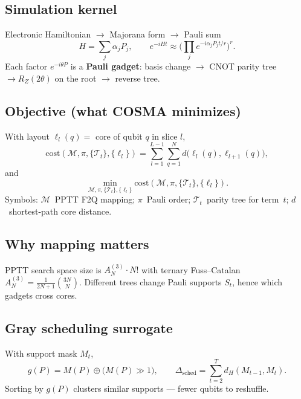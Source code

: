 \documentclass[11pt]{article}
\begin{document}
\subsection*{Simulation kernel}
Electronic Hamiltonian $\to$ Majorana form $\to$ Pauli sum
\begin{equation}
H=\sum_j \alpha_j P_j,\qquad
e^{-iHt}\approx\Bigg(\prod_j e^{-i\alpha_j P_j t/r}\Bigg)^r.
\end{equation}
Each factor $e^{-i\theta P}$ is a \textbf{Pauli gadget}: basis change $\to$ CNOT parity tree
$\to R_Z(2\theta)$ on the root $\to$ reverse tree.

\subsection*{Objective (what COSMA minimizes)}
With layout $\ell_l(q)=$ core of qubit $q$ in slice $l$,
\begin{equation}
\mathrm{cost}(\mathcal{M},\pi,\{\mathcal{T}_t\},\{\ell_l\})
=\sum_{l=1}^{L-1}\sum_{q=1}^{N} d\!\big(\ell_l(q),\ell_{l+1}(q)\big),
\label{eq:cost}
\end{equation}
and
\begin{equation}
\min_{\mathcal{M},\pi,\{\mathcal{T}_t\},\{\ell_l\}}
\mathrm{cost}(\mathcal{M},\pi,\{\mathcal{T}_t\},\{\ell_l\}).
\end{equation}
Symbols: $\mathcal{M}$~PPTT F2Q mapping; $\pi$~Pauli order; $\mathcal{T}_t$~parity tree for term~$t$;
$d$~shortest-path core distance.

\subsection*{Why mapping matters}
PPTT search space size is $A_N^{(3)}\cdot N!$ with ternary Fuss--Catalan
$A_N^{(3)}=\frac{1}{2N+1}\binom{3N}{N}$. Different trees change Pauli supports $S_t$,
hence which gadgets cross cores.

\subsection*{Gray scheduling surrogate}
With support mask $M_t$,
\begin{equation}
g(P)=M(P)\oplus\big(M(P)\gg 1\big),\qquad
\Delta_{\mathrm{sched}}=\sum_{t=2}^{T} d_H(M_{t-1},M_t).
\end{equation}
Sorting by $g(P)$ clusters similar supports --- fewer qubits to reshuffle.
\end{document}
